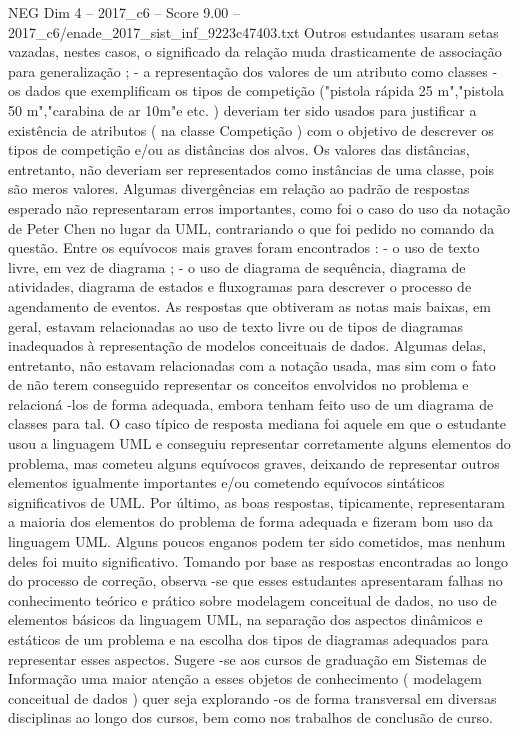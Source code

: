 \begin{textsample}{NEG Dim 4 – 2017\_c6 – Score 9.00 – 2017\_c6/enade\_2017\_sist\_inf\_9223c47403.txt}
Outros estudantes usaram setas vazadas, nestes casos, o significado da relação muda drasticamente de associação para generalização ; - a representação dos valores de um atributo como classes - os dados que exemplificam os tipos de competição ("pistola rápida 25 m","pistola 50 m","carabina de ar 10m"e etc. ) deveriam ter sido usados para justificar a existência de atributos ( na classe Competição ) com o objetivo de descrever os tipos de competição e/ou as distâncias dos alvos.
Os valores das distâncias, entretanto, não deveriam ser representados como instâncias de uma classe, pois são meros valores.
Algumas divergências em relação ao padrão de respostas esperado não representaram erros importantes, como foi o caso do uso da notação de Peter Chen no lugar da UML, contrariando o que foi pedido no comando da questão.
Entre os equívocos mais graves foram encontrados : - o uso de texto livre, em vez de diagrama ; - o uso de diagrama de sequência, diagrama de atividades, diagrama de estados e fluxogramas para descrever o processo de agendamento de eventos.
As respostas que obtiveram as notas mais baixas, em geral, estavam relacionadas ao uso de texto livre ou de tipos de diagramas inadequados à representação de modelos conceituais de dados.
Algumas delas, entretanto, não estavam relacionadas com a notação usada, mas sim com o fato de não terem conseguido representar os conceitos envolvidos no problema e relacioná -los de forma adequada, embora tenham feito uso de um diagrama de classes para tal.
O caso típico de resposta mediana foi aquele em que o estudante usou a linguagem UML e conseguiu representar corretamente alguns elementos do problema, mas cometeu alguns equívocos graves, deixando de representar outros elementos igualmente importantes e/ou cometendo equívocos sintáticos significativos de UML.
Por último, as boas respostas, tipicamente, representaram a maioria dos elementos do problema de forma adequada e fizeram bom uso da linguagem UML.
Alguns poucos enganos podem ter sido cometidos, mas nenhum deles foi muito significativo.
Tomando por base as respostas encontradas ao longo do processo de correção, observa -se que esses estudantes apresentaram falhas no conhecimento teórico e prático sobre modelagem conceitual de dados, no uso de elementos básicos da linguagem UML, na separação dos aspectos dinâmicos e estáticos de um problema e na escolha dos tipos de diagramas adequados para representar esses aspectos.
Sugere -se aos cursos de graduação em Sistemas de Informação uma maior atenção a esses objetos de conhecimento ( modelagem conceitual de dados ) quer seja explorando -os de forma transversal em diversas disciplinas ao longo dos cursos, bem como nos trabalhos de conclusão de curso.

\end{textsample}

